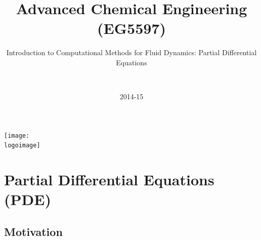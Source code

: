\documentclass[10pt,compress,handout,ignorenonframetext]{beamer}
\institute{School of Engineering}
\title{Advanced Chemical Engineering (EG5597)}
\subtitle{Introduction to Computational Methods for Fluid Dynamics: Partial Differential Equations}
\date[2014-15]{2014-15}
\author[\shortname]{%
  \fullname\\\ttfamily{\emailaddress}
}
\newcommand{\logoimage}{./FigBanner/UoAHorizBanner}
\begin{document}
\begin{frame}
  \titlepage
  \vfill%
  \begin{center}
    \texttt{[image: \\logoimage]}
  \end{center}
\end{frame}







\section{Partial Differential Equations (PDE)} 

\subsection{Motivation}
\end{document}
